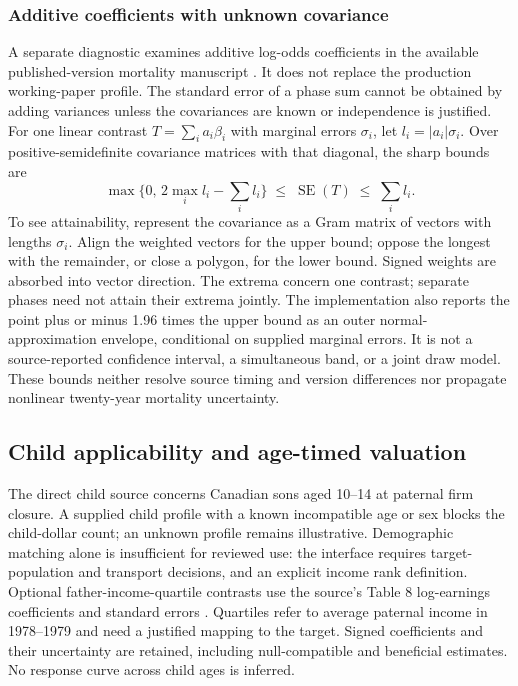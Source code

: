 \documentclass[10pt]{article}
\begin{document}
\subsubsection{Additive coefficients with unknown covariance}
A separate diagnostic examines additive log-odds coefficients in the
available published-version mortality manuscript \cite{sullivan2009}.
It does not replace the production working-paper profile. The standard
error of a phase sum cannot be obtained by adding variances unless the
covariances are known or independence is justified. For one linear contrast
$T=\sum_i a_i\beta_i$ with marginal errors $\sigma_i$, let
$l_i=|a_i|\sigma_i$. Over positive-semidefinite covariance matrices with
that diagonal, the sharp bounds are
\begin{equation}
 \max\{0,\,2\max_i l_i-\sum_i l_i\}
 \;\leq\; \operatorname{SE}(T) \;\leq\; \sum_i l_i.
\end{equation}
To see attainability, represent the covariance as a Gram matrix of vectors
with lengths $\sigma_i$. Align the weighted vectors for the upper bound;
oppose the longest with the remainder, or close a polygon, for the lower
bound. Signed weights are absorbed into vector direction. The extrema concern
one contrast; separate phases need not attain their extrema jointly.
The implementation also reports the point plus or minus 1.96 times the
upper bound as an outer normal-approximation envelope, conditional on supplied
marginal errors. It is not a source-reported confidence interval, a simultaneous
band, or a joint draw model. These bounds neither resolve source timing and
version differences nor propagate nonlinear twenty-year mortality uncertainty.

\subsection{Child applicability and age-timed valuation}
The direct child source concerns Canadian sons aged 10--14 at paternal
firm closure. A supplied child profile with a known incompatible age or
sex blocks the child-dollar count; an unknown profile remains illustrative.
Demographic matching alone is insufficient for reviewed use: the interface
requires target-population and transport decisions, and an explicit income
rank definition. Optional father-income-quartile contrasts use the source's
Table 8 log-earnings coefficients and standard errors
\cite{oreopoulos2008}. Quartiles refer to average paternal income in
1978--1979 and need a justified mapping to the target. Signed coefficients
and their uncertainty are retained, including null-compatible and
beneficial estimates. No response curve across child ages is inferred.
\end{document}

